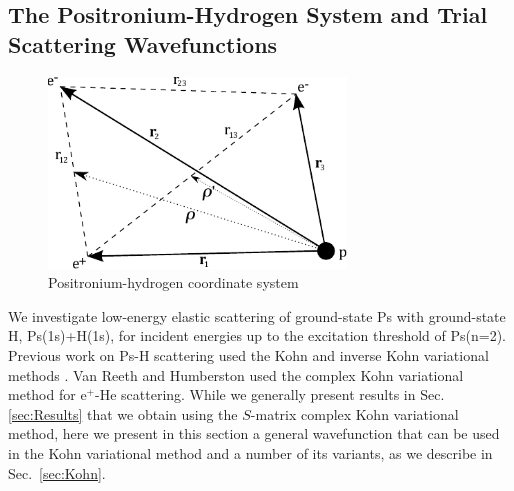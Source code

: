 \documentclass[preprint,showpacs,showkeys,preprintnumbers,amsmath,amssymb,longbibliography,pra,aps]{revtex4-1}
\begin{document}
\subsection{The Positronium-Hydrogen System and Trial Scattering Wavefunctions}
\begin{figure}[H]
	\centering
	\includegraphics[height=2in]{PsHCoordinates}
	\caption{Positronium-hydrogen coordinate system}
	\label{fig:PsHCoords}
\end{figure}

We investigate low-energy elastic scattering of ground-state Ps
with ground-state H, Ps(1s)+H(1s), for incident energies up to the excitation
threshold of Ps(n=2).
Previous work on Ps-H scattering used the Kohn and inverse Kohn variational
methods \cite{VanReeth2003, VanReeth2004}. 
Van Reeth and Humberston \cite{VanReeth1999} used the complex Kohn 
variational method for e$^+$-He scattering. While we generally present
results in Sec. \ref{sec:Results} that we obtain using the $S$-matrix
complex Kohn variational method, here we present in
this section a general wavefunction that can be used in the Kohn
variational method and a number of its variants,
as we describe in Sec.~\ref{sec:Kohn}.
\end{document}
